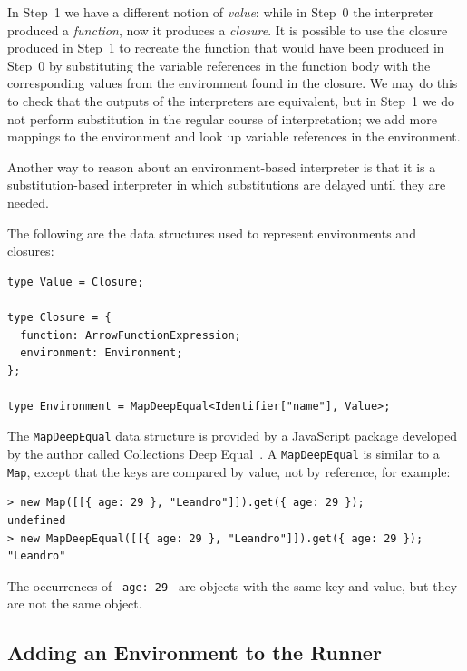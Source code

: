 \documentclass[12pt, oneside]{book}
\begin{document}
In Step~1 we have a different notion of \emph{value}: while in Step~0 the interpreter produced a \emph{function}, now it produces a \emph{closure}. It is possible to use the closure produced in Step~1 to recreate the function that would have been produced in Step~0 by substituting the variable references in the function body with the corresponding values from the environment found in the closure. We may do this to check that the outputs of the interpreters are equivalent, but in Step~1 we do not perform substitution in the regular course of interpretation; we add more mappings to the environment and look up variable references in the environment.

\begin{mdframed}[frametitle = {Alternative Argument}]
Another way to reason about an environment-based interpreter is that it is a substitution-based interpreter in which substitutions are delayed until they are needed.
\end{mdframed}

The following are the data structures used to represent environments and closures:

\begin{verbatim}
type Value = Closure;

type Closure = {
  function: ArrowFunctionExpression;
  environment: Environment;
};

type Environment = MapDeepEqual<Identifier["name"], Value>;
\end{verbatim}

\begin{mdframed}[frametitle = {Implementation Details}]
The \texttt{MapDeepEqual} data structure is provided by a JavaScript package developed by the author called Collections Deep Equal~\cite{collections-deep-equal}. A \texttt{MapDeepEqual} is similar to a \texttt{Map}, except that the keys are compared by value, not by reference, for example:

\begin{verbatim}
> new Map([[{ age: 29 }, "Leandro"]]).get({ age: 29 });
undefined
> new MapDeepEqual([[{ age: 29 }, "Leandro"]]).get({ age: 29 });
"Leandro"
\end{verbatim}

The occurrences of \texttt{{ age: 29 }} are objects with the same key and value, but they are not the same object.
\end{mdframed}

\subsection{Adding an Environment to the Runner}
\end{document}
